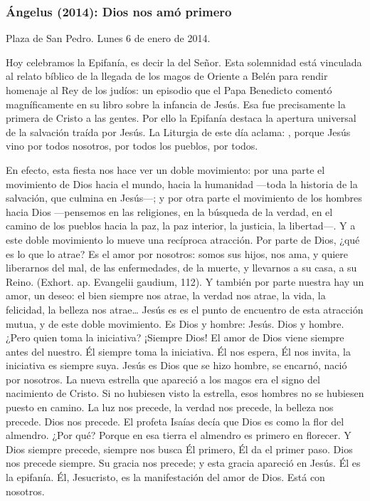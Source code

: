 {\subsubsection{Ángelus (2014): Dios nos amó primero}

Plaza de San Pedro. Lunes 6 de enero de 2014.

Hoy celebramos la Epifanía, es decir la  del Señor. Esta solemnidad está vinculada al relato bíblico de la llegada de los magos de Oriente a Belén para rendir homenaje al Rey de los judíos: un episodio que el Papa Benedicto comentó magníficamente en su libro sobre la infancia de Jesús. Esa fue precisamente la primera  de Cristo a las gentes. Por ello la Epifanía destaca la apertura universal de la salvación traída por Jesús. La Liturgia de este día aclama: , porque Jesús vino por todos nosotros, por todos los pueblos, por todos.

En efecto, esta fiesta nos hace ver un doble movimiento: por una parte el movimiento de Dios hacia el mundo, hacia la humanidad ---toda la historia de la salvación, que culmina en Jesús---; y por otra parte el movimiento de los hombres hacia Dios ---pensemos en las religiones, en la búsqueda de la verdad, en el camino de los pueblos hacia la paz, la paz interior, la justicia, la libertad---. Y a este doble movimiento lo mueve una recíproca atracción. Por parte de Dios, ¿qué es lo que lo atrae? Es el amor por nosotros: somos sus hijos, nos ama, y quiere liberarnos del mal, de las enfermedades, de la muerte, y llevarnos a su casa, a su Reino.  (Exhort. ap. Evangelii gaudium, 112). Y también por parte nuestra hay un amor, un deseo: el bien siempre nos atrae, la verdad nos atrae, la vida, la felicidad, la belleza nos atrae\ldots{} Jesús es es el punto de encuentro de esta atracción mutua, y de este doble movimiento. Es Dios y hombre: Jesús. Dios y hombre. ¿Pero quien toma la iniciativa? ¡Siempre Dios! El amor de Dios viene siempre antes del nuestro. Él siempre toma la iniciativa. Él nos espera, Él nos invita, la iniciativa es siempre suya. Jesús es Dios que se hizo hombre, se encarnó, nació por nosotros. La nueva estrella que apareció a los magos era el signo del nacimiento de Cristo. Si no hubiesen visto la estrella, esos hombres no se hubiesen puesto en camino. La luz nos precede, la verdad nos precede, la belleza nos precede. Dios nos precede. El profeta Isaías decía que Dios es como la flor del almendro. ¿Por qué? Porque en esa tierra el almendro es primero en florecer. Y Dios siempre precede, siempre nos busca Él primero, Él da el primer paso. Dios nos precede siempre. Su gracia nos precede; y esta gracia apareció en Jesús. Él es la epifanía. Él, Jesucristo, es la manifestación del amor de Dios. Está con nosotros.

}
